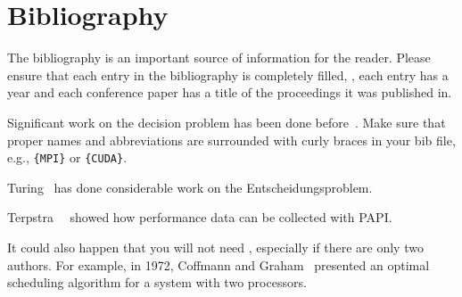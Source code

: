 \section{Bibliography}

The bibliography is an important source of information for the reader.
Please ensure that each entry in the bibliography is completely
filled, \eg, each entry has a year and each conference paper has a
title of the proceedings it was published in.

Significant work on the decision problem has been done
before~\cite{Turing1936}.  Make sure that proper names and
abbreviations are surrounded with curly braces in your bib file, e.g.,
\verb|{MPI}| or \verb|{CUDA}|.

Turing~\cite{Turing1936} has done considerable work on the Entscheidungsproblem.

Terpstra~\etal~\cite{papi} showed how performance data can be collected with PAPI.

It could also happen that you will not need \etal, especially if there
are only two authors. For example, in 1972, Coffmann and
Graham~\cite{CoffmanG72} presented an optimal scheduling algorithm for
a system with two processors.

